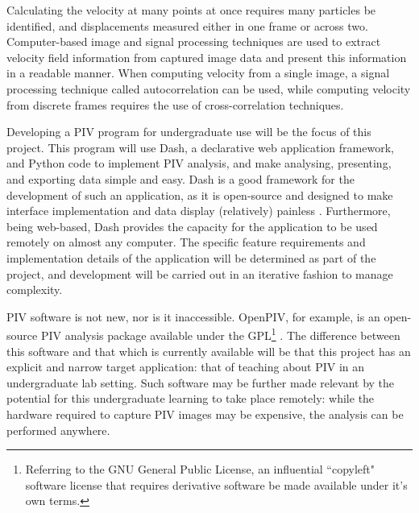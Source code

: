 \documentclass[12pt, a4paper]{amsart}
\begin{document}
Calculating the velocity at many points at once requires many particles be identified, and displacements measured either in one frame or across two. Computer-based image and signal processing techniques are used to extract velocity field information from captured image data and present this information in a readable manner. When computing velocity from a single image, a signal processing technique called autocorrelation can be used, while computing velocity from discrete frames requires the use of cross-correlation techniques.

Developing a PIV program for undergraduate use will be the focus of this project. This program will use Dash, a declarative web application framework, and Python code to implement PIV analysis, and make analysing, presenting, and exporting data simple and easy. Dash is a good framework for the development of such an application, as it is open-source and designed to make interface implementation and data display (relatively) painless \cite{aboutdash}. Furthermore, being web-based, Dash provides the capacity for the application to be used remotely on almost any computer. The specific feature requirements and implementation details of the application will be determined as part of the project, and development will be carried out in an iterative fashion to manage complexity. 

PIV software is not new, nor is it inaccessible. OpenPIV, for example, is an open-source PIV analysis package available under the GPL\footnote{Referring to the GNU General Public License, an influential ``copyleft" software license that requires derivative software be made available under it's own terms.} \cite{openpiv}. The difference between this software and that which is currently available will be that this project has an explicit and narrow target application: that of teaching about PIV in an undergraduate lab setting. Such software may be further made relevant by the potential for this undergraduate learning to take place remotely: while the hardware required to capture PIV images may be expensive, the analysis can be performed anywhere.
\end{document}

